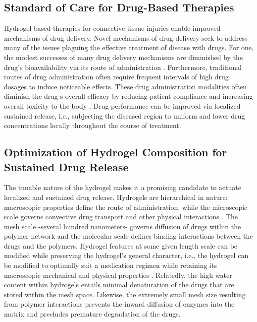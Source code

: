 \subsection{Standard of Care for Drug-Based Therapies}
Hydrogel-based therapies for connective tissue injuries enable improved mechanisms of drug delivery. Novel mechanisms of drug delivery seek to address many of the issues plaguing the effective treatment of disease with drugs. For one, the modest successes of many drug delivery mechanisms are diminished by the drug's bioavailability via its route of administration \autocite{nsaids}. Furthermore, traditional routes of drug administration often require frequent intervals of high drug dosages to induce noticeable effects. These drug administration modalities often diminish the drug-s overall efficacy by reducing patient compliance and increasing overall toxicity to the body \autocite{nsaids}. Drug performance can be improved via localized sustained release, i.e., subjecting the diseased region to uniform and lower drug concentrations locally throughout the course of treatment.

\subsection{Optimization of Hydrogel Composition for Sustained Drug Release}
The tunable nature of the hydrogel makes it a promising candidate to actuate localized and sustained drug release. Hydrogels are hierarchical in nature: macroscopic properties define the route of administration, while the microscopic scale governs convective drug transport and other physical interactions \autocite{mooney_drug}. The mesh scale -several hundred nanometers- governs diffusion of drugs within the polymer network and the molecular scale defines binding interactions between the drugs and the polymers. Hydrogel features at some given length scale can be modified while preserving the hydrogel's general character, i.e., the hydrogel can be modified to optimally suit a medication regimen while retaining its macroscopic mechanical and physical properties \autocite{mooney_drug}.  Relatedly, the high water content within hydrogels entails minimal denaturation of the drugs that are stored within the mesh space. Likewise, the extremely small mesh size resulting from polymer interactions prevents the inward diffusion of enzymes into the matrix and precludes premature degradation of the drugs. 

